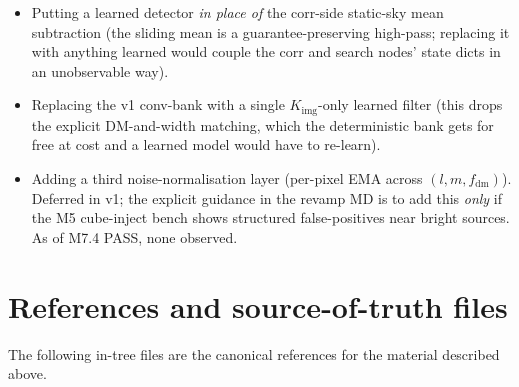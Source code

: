 \documentclass[11pt,a4paper]{article}
\newcommand{\codeword}[1]{\text{\ttfamily\small\detokenize{#1}}}
\begin{document}
\begin{itemize}[topsep=2pt,itemsep=2pt]
\item Putting a learned detector \emph{in place of} the corr-side
      static-sky mean subtraction (the sliding mean is a
      guarantee-preserving high-pass; replacing it with anything
      learned would couple the corr and search nodes' state dicts in
      an unobservable way).
\item Replacing the v1 conv-bank with a single $K_\mathrm{img}$-only
      learned filter (this drops the explicit DM-and-width matching,
      which the deterministic bank gets for free at \codeword{boxcar_via_cumsum}
      cost and a learned model would have to re-learn).
\item Adding a third noise-normalisation layer (per-pixel EMA across
      $(l, m, f_\mathrm{dm})$).  Deferred in v1; the explicit guidance
      in the revamp MD is to add this \emph{only} if the M5 cube-inject
      bench shows structured false-positives near bright sources.  As
      of M7.4 PASS, none observed.
\end{itemize}


\section{References and source-of-truth files}
\label{sec:refs}

The following in-tree files are the canonical references for the
material described above.
\end{document}
